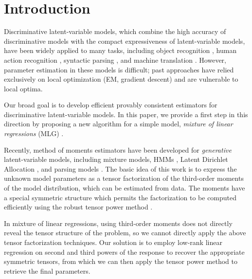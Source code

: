 \section{Introduction}
\label{sec:intro}

Discriminative latent-variable models,
which combine the high accuracy of discriminative models
with the compact expressiveness of latent-variable models,
have been widely applied to many tasks, including
object recognition \cite{quattoni04crf},
human action recognition \cite{wang09crf},
syntactic parsing \cite{petrov08discriminative},
and machine translation \cite{liang06discrimative}.
However, parameter estimation in these models is difficult;
past approaches have relied exclusively on local optimization (EM, 
gradient descent) and are vulnerable to local optima.

Our broad goal is to develop efficient provably consistent estimators for
discriminative latent-variable models.
In this paper, we provide a first step in this 
direction by proposing a new algorithm for a simple model,
\emph{mixture of linear regressions} (MLG) \cite{VieleTong2002}.

Recently, method of moments estimators have been developed for
\emph{generative} latent-variable models, including
mixture models, HMMs \cite{AnandkumarHsuKakade2012},
Latent Dirichlet Allocation \cite{anandkumar12lda},
and parsing models \cite{hsu12identifiability}.
The basic idea of this work is to express
the unknown model parameters as a tensor factorization
of the third-order moments of the model distribution, which
can be estimated from data.
The moments have a special symmetric structure
which permits the factorization to be computed efficiently using the robust
tensor power method \cite{AnandkumarGeHsu2012}.

In mixture of linear regressions, using third-order moments does not
directly reveal the tensor structure of the problem, so we cannot
directly apply the above tensor factorization techniques.  Our solution
is to employ low-rank linear regression
\cite{NegahbanWainwright2009,Tomioka2011} on second and third powers of
the response to recover the appropriate symmetric tensors, from which we
can then apply the tensor power method to retrieve the final parameters.

